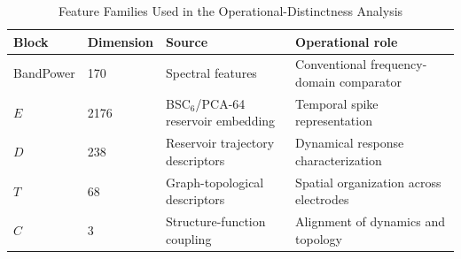 \begin{table}[!t]
\caption{Feature Families Used in the Operational-Distinctness Analysis}
\label{tab:feature_blocks}
\centering
\footnotesize
\begin{tabular}{llll}
\hline
Block & Dimension & Source & Operational role \\
\hline
BandPower & 170 & Spectral features & Conventional frequency-domain comparator \\
$E$ & 2176 & BSC$_6$/PCA-64 reservoir embedding & Temporal spike representation \\
$D$ & 238 & Reservoir trajectory descriptors & Dynamical response characterization \\
$T$ & 68 & Graph-topological descriptors & Spatial organization across electrodes \\
$C$ & 3 & Structure-function coupling & Alignment of dynamics and topology \\
\hline
\end{tabular}
\end{table}
